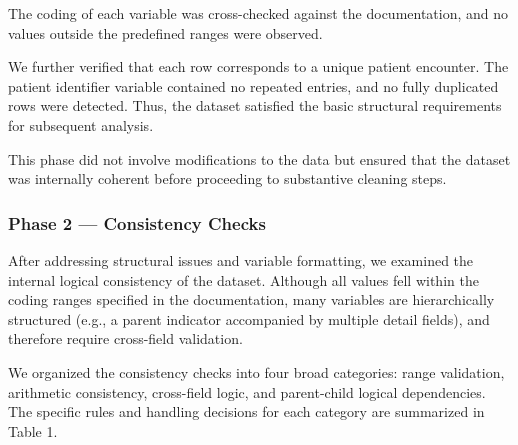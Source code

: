 \documentclass[11pt,letterpaper]{article}
\begin{document}
The coding of each variable was cross-checked against the documentation, and no values outside the predefined ranges were observed.

We further verified that each row corresponds to a unique patient encounter. The patient identifier variable contained no repeated entries, and no fully duplicated rows were detected. Thus, the dataset satisfied the basic structural requirements for subsequent analysis.

This phase did not involve modifications to the data but ensured that the dataset was internally coherent before proceeding to substantive cleaning steps.

\subsubsection{Phase 2 — Consistency Checks}\label{Phase 2 — Consistency Checks}

After addressing structural issues and variable formatting, we examined the internal logical consistency of the dataset. Although all values fell within the coding ranges specified in the documentation, many variables are hierarchically structured (e.g., a parent indicator accompanied by multiple detail fields), and therefore require cross-field validation.

We organized the consistency checks into four broad categories: range validation, arithmetic consistency, cross-field logic, and parent-child logical dependencies. The specific rules and handling decisions for each category are summarized in Table 1.
\end{document}
